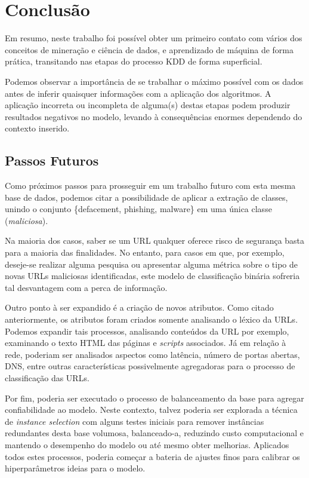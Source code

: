 \documentclass[a4paper, 12pt]{article}
\begin{document}
\pagebreak

\section{Conclusão}

Em resumo, neste trabalho foi possível obter um primeiro contato com vários dos conceitos de mineração e ciência de dados, e aprendizado de máquina de forma prática, transitando nas etapas do processo KDD de forma superficial. 

Podemos observar a importância de se trabalhar o máximo possível com os dados antes de inferir quaisquer informações com a aplicação dos algoritmos. A aplicação incorreta ou incompleta de alguma(s) destas etapas podem produzir resultados negativos no modelo, levando à consequências enormes dependendo do contexto inserido.

\subsection{Passos Futuros}

Como próximos passos para prosseguir em um trabalho futuro com esta mesma base de dados, podemos citar a possibilidade de aplicar a extração de classes, unindo o conjunto \{defacement, phishing, malware\} em uma única classe (\emph{maliciosa}).

Na maioria dos casos, saber se um URL qualquer oferece risco de segurança basta para a maioria das finalidades. No entanto, para casos em que, por exemplo, deseje-se realizar alguma pesquisa ou apresentar alguma métrica sobre o tipo de novas URLs maliciosas identificadas, este modelo de classificação binária sofreria tal desvantagem com a perca de informação.

Outro ponto à ser expandido é a criação de novos atributos. Como citado anteriormente, os atributos foram criados somente analisando o léxico da URLs. Podemos expandir tais processos, analisando conteúdos da URL por exemplo, examinando o texto HTML das páginas e \emph{scripts} associados. Já em relação à rede, poderiam ser analisados aspectos como latência, número de portas abertas, DNS, entre outras características possivelmente agregadoras para o processo de classificação das URLs.

Por fim, poderia ser executado o processo de balanceamento da base para agregar confiabilidade ao modelo. Neste contexto, talvez poderia ser explorada a técnica de \emph{instance selection} com alguns testes iniciais para remover instâncias redundantes desta base volumosa, balanceado-a, reduzindo custo computacional e mantendo o desempenho do modelo ou até mesmo obter melhorias. Aplicados todos estes processos, poderia começar a bateria de ajustes finos para calibrar os hiperparâmetros ideias para o modelo.



\end{document}
